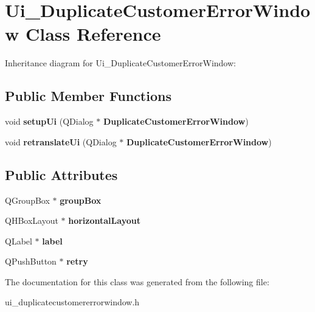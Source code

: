 \section{Ui\+\_\+\+Duplicate\+Customer\+Error\+Window Class Reference}
\label{class_ui___duplicate_customer_error_window}


Inheritance diagram for Ui\+\_\+\+Duplicate\+Customer\+Error\+Window\+:
\subsection*{Public Member Functions}
\begin{DoxyCompactItemize}
\item 
\mbox{\label{class_ui___duplicate_customer_error_window_ad64e2e59eb64273fe40b9fcf8e276bc7}} 
void {\bfseries setup\+Ui} (Q\+Dialog $\ast$\textbf{ Duplicate\+Customer\+Error\+Window})
\item 
\mbox{\label{class_ui___duplicate_customer_error_window_a98fc78e2a001a26229ff439a8e84819b}} 
void {\bfseries retranslate\+Ui} (Q\+Dialog $\ast$\textbf{ Duplicate\+Customer\+Error\+Window})
\end{DoxyCompactItemize}
\subsection*{Public Attributes}
\begin{DoxyCompactItemize}
\item 
\mbox{\label{class_ui___duplicate_customer_error_window_adfb0668a06a64d85b6f3455c3eb6cc63}} 
Q\+Group\+Box $\ast$ {\bfseries group\+Box}
\item 
\mbox{\label{class_ui___duplicate_customer_error_window_a8d1c24438d8f16d3a3ab2af51b8ad4ad}} 
Q\+H\+Box\+Layout $\ast$ {\bfseries horizontal\+Layout}
\item 
\mbox{\label{class_ui___duplicate_customer_error_window_a074a6397f6c4ed599a7053ace75a3427}} 
Q\+Label $\ast$ {\bfseries label}
\item 
\mbox{\label{class_ui___duplicate_customer_error_window_a37f84065893830dad31e3fd4219f4bee}} 
Q\+Push\+Button $\ast$ {\bfseries retry}
\end{DoxyCompactItemize}


The documentation for this class was generated from the following file\+:\begin{DoxyCompactItemize}
\item 
ui\+\_\+duplicatecustomererrorwindow.\+h\end{DoxyCompactItemize}
